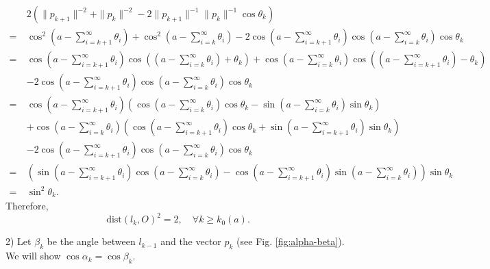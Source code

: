 \documentclass[12pt]{article}
\begin{document}
$$
\begin{aligned}
&
2\left(\|p_{k+1}\|^{-2} + \| p_{k}\|^{-2} -2 \| p_{k+1}\|^{-1} \|p_{k}\|^{-1} \cos \theta_k\right)
\\
=\ & \cos^2 \left(a- \sum_{i={k+1}}^{\infty} \theta_i \right) 
+\cos^2 \left(a- \sum_{i=k}^{\infty} \theta_i\right) 
- 2\cos \left(a-  \sum_{i=k+1}^{\infty} \theta_i\right) 
\cos \left(a-  \sum_{i=k}^{\infty} \theta_i\right)  \cos \theta_k
\\
=\ & \cos \left(a- \sum_{i={k+1}}^{\infty} \theta_i \right) 
\cos \left(\left(a- \sum_{i={k}}^{\infty} \theta_i \right)+ \theta_k \right) 
+ \cos \left(a- \sum_{i=k}^{\infty} \theta_i\right) 
\cos \left(\left(a- \sum_{i=k+1}^{\infty} \theta_i \right)- \theta_k\right) \\
&- 2\cos \left(a-  \sum_{i=k+1}^{\infty} \theta_i\right) 
\cos \left(a-  \sum_{i=k}^{\infty} \theta_i\right)  \cos \theta_k\\
=\ &\cos \left(a- \sum_{i={k+1}}^{\infty} \theta_i \right) 
\left(\cos 
\left(a- \sum_{i={k}}^{\infty} \theta_i \right) 
\cos \theta_k 
- \sin
\left(a- \sum_{i={k}}^{\infty} \theta_i \right)  
 \sin \theta_k \right)
 \\
& +
\cos 
\left(a- \sum_{i={k}}^{\infty} \theta_i \right) 
\left(\cos
\left(a- \sum_{i={k+1}}^{\infty} \theta_i \right) 
 \cos \theta_k 
+ \sin
\left(a- \sum_{i={k+1}}^{\infty} \theta_i \right) 
\sin \theta_k \right)\\
& - 2\cos \left(a-  \sum_{i=k+1}^{\infty} \theta_i\right) 
\cos \left(a-  \sum_{i=k}^{\infty} \theta_i\right)  \cos \theta_k
\\
=\ &\left(
\sin 
\left(a- \sum_{i={k+1}}^{\infty} \theta_i \right) 
\cos 
\left(a- \sum_{i={k}}^{\infty} \theta_i \right) 
-
\cos 
\left(a- \sum_{i={k+1}}^{\infty} \theta_i \right) 
\sin
\left(a- \sum_{i={k}}^{\infty} \theta_i \right)
\right)
\sin \theta_k\\
=\ &\sin^2\theta_k .
\end{aligned}
$$
Therefore, 
$$
\text{dist}(l_k, O)^2 = 2, \quad \forall k\geq k_0(a).
$$


2)
Let $\beta_{k}$ be the angle between $l_{k-1}$ and the vector $p_{k}$ (see Fig. \ref{fig:alpha-beta}). 
We will show $\cos \alpha_k= \cos \beta_k$.
\end{document}
